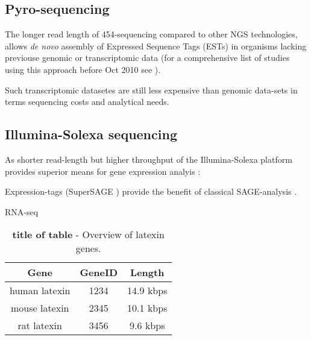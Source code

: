 


\subsection{Pyro-sequencing}

The longer read length of 454-sequencing \cite{pmid16056220} compared
to other NGS technologies, allows \textit{de novo} assembly of
Expressed Sequence Tags (ESTs) in organisms lacking previouse genomic
or transcriptomic data (for a comprehensive list of studies using this
approach before Oct 2010 see \cite{pmid20950480}).

Such transcriptomic datasetes are still less expensive than genomic
data-sets in terms sequencing costs and analytical needs.


\subsection{Illumina-Solexa sequencing}

As shorter read-length but higher throughput of the Illumina-Solexa
platform provides superior means for gene expression analyis
\cite{pmid21627854}:

Expression-tags (SuperSAGE \cite{pmid20967605}) provide the benefit of
classical SAGE-analysis  .

RNA-seq \cite{pmid19015660}

\begin{table}[htdp]
\centering
\begin{tabular}{ccc} %

{\bf Gene} & {\bf GeneID} & {\bf Length} \\ 
\hline %

human latexin & 1234 & 14.9 kbps \\
mouse latexin & 2345 & 10.1 kbps \\
rat latexin   & 3456 & 9.6 kbps \\

\end{tabular}
\caption[title of table]{\textbf{title of table} - Overview of latexin genes.}
\label{latexin_genes} %
\end{table}




     